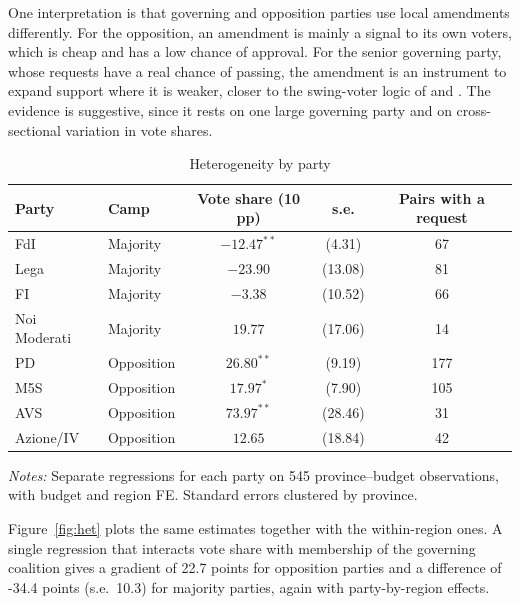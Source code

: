 \documentclass[12pt]{article}
\begin{document}
One interpretation is that governing and opposition parties use local amendments differently. For the opposition, an amendment is mainly a signal to its own voters, which is cheap and has a low chance of approval. For the senior governing party, whose requests have a real chance of passing, the amendment is an instrument to expand support where it is weaker, closer to the swing-voter logic of \citet{lindbeck1987} and \citet{dixit1996}. The evidence is suggestive, since it rests on one large governing party and on cross-sectional variation in vote shares.

\begin{table}[htbp]\centering\footnotesize\setlength{\tabcolsep}{4pt}
\begin{threeparttable}
\caption{Heterogeneity by party}\label{tab:het}
\begin{tabular}{llccc}
\toprule
Party & Camp & Vote share (10 pp) & s.e. & Pairs with a request \\
\midrule
FdI & Majority & $-12.47^{**}$ & (4.31) & 67 \\
Lega & Majority & $-23.90$ & (13.08) & 81 \\
FI & Majority & $-3.38$ & (10.52) & 66 \\
Noi Moderati & Majority & $19.77$ & (17.06) & 14 \\
PD & Opposition & $26.80^{**}$ & (9.19) & 177 \\
M5S & Opposition & $17.97^{*}$ & (7.90) & 105 \\
AVS & Opposition & $73.97^{**}$ & (28.46) & 31 \\
Azione/IV & Opposition & $12.65$ & (18.84) & 42 \\
\bottomrule
\end{tabular}
\begin{tablenotes}\footnotesize
\item \emph{Notes:} Separate regressions for each party on 545 province--budget observations, with budget and region FE. Standard errors clustered by province.
\end{tablenotes}
\end{threeparttable}
\end{table}

Figure~\ref{fig:het} plots the same estimates together with the within-region ones. A single regression that interacts vote share with membership of the governing coalition gives a gradient of 22.7 points for opposition parties and a difference of -34.4 points (s.e.\ 10.3) for majority parties, again with party-by-region effects.
\end{document}
